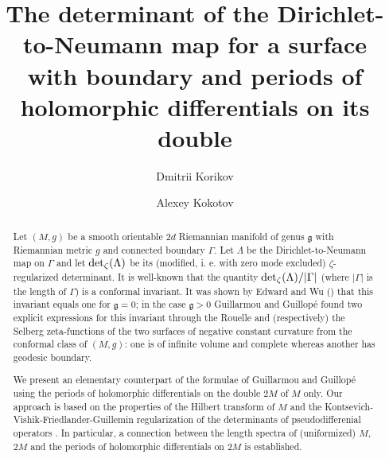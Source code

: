 \documentclass{amsart}
\begin{document}
\title[Determinant of the Dirichlet-to-Neumann map]{The determinant of the Dirichlet-to-Neumann map for a surface with boundary and periods of holomorphic differentials on its double}

\author{Dmitrii Korikov}
	\address{St. Petersburg Department of Steklov Mathematical Institute
of Russian Academy of Sciences, 27 Fontanka, St. Petersburg, Russia, \url{https://orcid.org/0000-0002-3212-5874}}
	
	\author{Alexey Kokotov}
	\address{Department of Mathematics \& Statistics, Concordia University, 1455 De Maisonneuve Blvd. W. Montreal, QC  H3G 1M8, Canada, \url{https://orcid.org/0000-0003-1940-0306}}
	
\begin{abstract}
Let $(M,g)$ be a smooth orientable $2d$ Riemannian manifold of genus $\mathfrak{g}$ with  Riemannian metric $g$ and connected boundary $\Gamma$. Let $\Lambda$ be the Dirichlet-to-Neumann map on $\Gamma$ and let ${\rm det}_\zeta(\Lambda)$ be its (modified, i. e. with  zero mode excluded) $\zeta$-regularized determinant. It is well-known that the quantity ${\rm det}_\zeta(\Lambda)/|\Gamma|$ (where $|\Gamma|$ is the length of $\Gamma$) is a conformal invariant. It was shown by Edward and Wu (\cite{EV}) that this invariant equals one for $\mathfrak{g}=0$; in the case $\mathfrak{g}>0$ Guillarmou and Guillop\'e \cite{Guillarmou} found two explicit expressions for this invariant through the Rouelle and (respectively) the Selberg zeta-functions of the two surfaces of negative constant curvature from the conformal class of $(M,g)$: one is  of infinite volume and complete whereas another has geodesic boundary. 

We present an elementary counterpart of the formulae of Guillarmou and Guillop\'e using  the periods of holomorphic differentials on the double $2M$ of $M$ only.  Our approach is based on the properties of the Hilbert transform of $M$ \cite{B,HilbKor} and the Kontsevich-Vishik-Friedlander-Guillemin regularization of the determinants of pseudodifferenial operators \cite{KV,Ww,F}. In particular, a connection between the length spectra of (uniformized) $M$, $2M$  and the periods of holomorphic differentials on $2M$  is established.
\end{abstract}

	\maketitle
\end{document}
